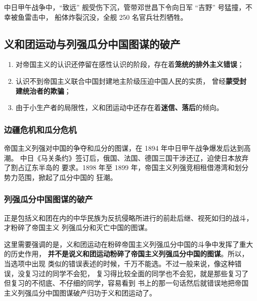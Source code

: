 \documentclass[10pt, UTF8]{book} %
\begin{document}
中日甲午战争中，“致远” 舰受伤下沉，管带邓世昌下令向日军 “吉野” 号猛撞，不幸被鱼雷击中，
船体炸裂沉没，全舰 250 名官兵壮烈牺牲。

\subsection{义和团运动与列强瓜分中国图谋的破产}

\begin{mdframed}[frametitle={义和团运动失败的原因：爱国切不可学义和团}]
    \begin{enumerate}[label=\textup{\arabic*}${}^\circ$, itemsep=0pt]
        \item 对帝国主义的认识还停留在感性认识的阶段，存在着\textbf{笼统的排外主义错误}；
        \item 认识不到帝国主义联合中国封建地主阶级压迫中国人民的实质，
        曾经\textbf{蒙受封建统治者的欺骗}；
        \item 由于小生产者的局限性，义和团运动中还存在着\textbf{迷信、落后}的倾向。
    \end{enumerate}
\end{mdframed}

\subsubsection{边疆危机和瓜分危机}

帝国主义列强对中国的争夺和瓜分的图谋，在 1894 年中日甲午战争爆发后达到高潮。
中日《马关条约》签订后，俄国、法国、德国三国干涉还辽，迫使日本放弃了割占辽东半岛的
要求。1898 年至 1899 年，帝国主义列强竞相租借港湾和划分势力范围，掀起了瓜分中国的
狂潮。

\subsubsection{列强瓜分中国图谋的破产}

正是包括义和团在内的中华民族为反抗侵略所进行的前赴后继、视死如归的战斗，才粉碎了帝国主义
列强瓜分和灭亡中国的图谋。
\begin{remark}
    这里需要强调的是，义和团运动在粉碎帝国主义列强瓜分中国的斗争中发挥了重大的历史作用，
    \textbf{并不是说义和团运动粉碎了帝国主义列强瓜分中国的图谋}。所以，当选项中出现
    类似的错误表述的时候，千万不能选。不过一般来说，像这种错误，没复习过的同学不会犯，
    复习得比较全面的同学也不会犯，就是那些复习了但复习的不彻底、不仔细的同学，容易看到
    书上的那一句话然后就错误地把帝国主义列强瓜分中国图谋破产归功于义和团运动了。
\end{remark}
\end{document}

